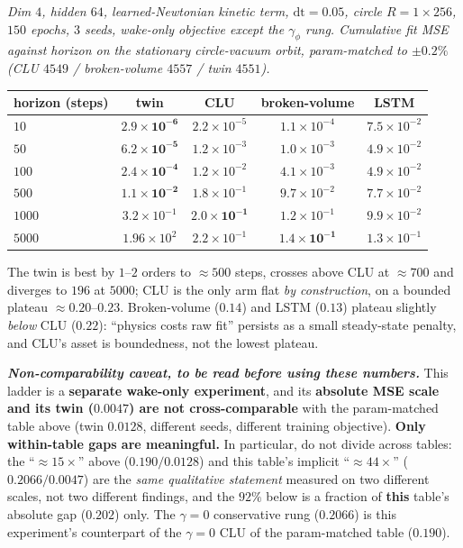 \documentclass{article}
\begin{document}
\emph{Dim $4$, hidden $64$, learned-Newtonian kinetic term, $\mathrm{dt}=0.05$, circle $R{=}1{\times}256$, $150$ epochs, $3$ seeds, wake-only objective except the $\gamma_\phi$ rung. Cumulative fit MSE against horizon on the stationary circle-vacuum orbit, param-matched to $\pm0.2\%$ (CLU $4549$ / broken-volume $4557$ / twin $4551$).}

\begin{center}
\begin{tabular}{lcccc}
\toprule
horizon (steps) & \textbf{twin} & \textbf{CLU} & broken-volume & LSTM \\
\midrule
$10$ & $\mathbf{2.9{\times}10^{-6}}$ & $2.2{\times}10^{-5}$ & $1.1{\times}10^{-4}$ & $7.5{\times}10^{-2}$ \\
$50$ & $\mathbf{6.2{\times}10^{-5}}$ & $1.2{\times}10^{-3}$ & $1.0{\times}10^{-3}$ & $4.9{\times}10^{-2}$ \\
$100$ & $\mathbf{2.4{\times}10^{-4}}$ & $1.2{\times}10^{-2}$ & $4.1{\times}10^{-3}$ & $4.9{\times}10^{-2}$ \\
$500$ & $\mathbf{1.1{\times}10^{-2}}$ & $1.8{\times}10^{-1}$ & $9.7{\times}10^{-2}$ & $7.7{\times}10^{-2}$ \\
$1000$ & $3.2{\times}10^{-1}$ & $\mathbf{2.0{\times}10^{-1}}$ & $1.2{\times}10^{-1}$ & $9.9{\times}10^{-2}$ \\
$5000$ & $1.96{\times}10^{2}$ & $2.2{\times}10^{-1}$ & $\mathbf{1.4{\times}10^{-1}}$ & $1.3{\times}10^{-1}$ \\
\bottomrule
\end{tabular}
\end{center}

The twin is best by $1$--$2$ orders to $\approx500$ steps, crosses above CLU at $\approx700$ and diverges to $196$ at $5000$; CLU is the only arm flat \emph{by construction}, on a bounded plateau $\approx0.20$--$0.23$. Broken-volume ($0.14$) and LSTM ($0.13$) plateau slightly \emph{below} CLU ($0.22$): ``physics costs raw fit'' persists as a small steady-state penalty, and CLU's asset is boundedness, not the lowest plateau.

\emph{\textbf{Non-comparability caveat, to be read before using these numbers.}} This ladder is a \textbf{separate wake-only experiment}, and its \textbf{absolute MSE scale and its twin ($0.0047$) are not cross-comparable} with the param-matched table above (twin $0.0128$, different seeds, different training objective). \textbf{Only within-table gaps are meaningful.} In particular, do not divide across tables: the ``$\approx15\times$'' above ($0.190/0.0128$) and this table's implicit ``$\approx44\times$'' ($0.2066/0.0047$) are the \emph{same qualitative statement} measured on two different scales, not two different findings, and the $92\%$ below is a fraction of \textbf{this} table's absolute gap ($0.202$) only. The $\gamma=0$ conservative rung ($0.2066$) is this experiment's counterpart of the $\gamma=0$ CLU of the param-matched table ($0.190$).
\end{document}
